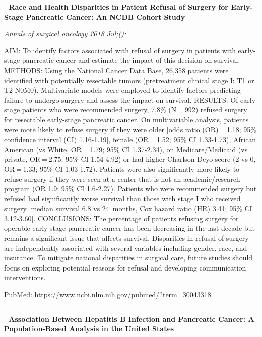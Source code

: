 \documentclass[]{article}
\begin{document}
 - \textbf{Race and Health Disparities in Patient Refusal of Surgery for
Early-Stage Pancreatic Cancer: An NCDB Cohort Study}

\emph{Annals of surgical oncology 2018 Jul;():}

AIM: To identify factors associated with refusal of surgery in patients
with early-stage pancreatic cancer and estimate the impact of this
decision on survival. METHODS: Using the National Cancer Data Base,
26,358 patients were identified with potentially resectable tumors
(pretreatment clinical stage I: T1 or T2 N0M0). Multivariate models were
employed to identify factors predicting failure to undergo surgery and
assess the impact on survival. RESULTS: Of early-stage patients who were
recommended surgery, 7.8\% (N = 992) refused surgery for resectable
early-stage pancreatic cancer. On multivariable analysis, patients were
more likely to refuse surgery if they were older {[}odds ratio
(OR) = 1.18; 95\% confidence interval (CI) 1.16-1.19{]}, female
(OR = 1.52; 95\% CI 1.33-1.73), African American (vs White, OR = 1.79;
95\% CI 1.37-2.34), on Medicare/Medicaid (vs private, OR = 2.75; 95\% CI
1.54-4.92) or had higher Charlson-Deyo score (2 vs 0, OR = 1.33; 95\% CI
1.03-1.72). Patients were also significantly more likely to refuse
surgery if they were seen at a center that is not an academic/research
program (OR 1.9; 95\% CI 1.6-2.27). Patients who were recommended
surgery but refused had significantly worse survival than those with
stage I who received surgery {[}median survival 6.8 vs 24~months, Cox
hazard ratio (HR) 3.41; 95\% CI 3.12-3.60{]}. CONCLUSIONS: The
percentage of patients refusing surgery for operable early-stage
pancreatic cancer has been decreasing in the last decade but remains a
significant issue that affects survival. Disparities in refusal of
surgery are independently associated with several variables including
gender, race, and insurance. To mitigate national disparities in
surgical care, future studies should focus on exploring potential
reasons for refusal and developing communication interventions.

PubMed: \url{https://www.ncbi.nlm.nih.gov/pubmed/?term=30043318}

{}

{}

\begin{center}\rule{0.5\linewidth}{\linethickness}\end{center}

 - \textbf{Association Between Hepatitis B Infection and Pancreatic
Cancer: A Population-Based Analysis in the United States}
\end{document}

